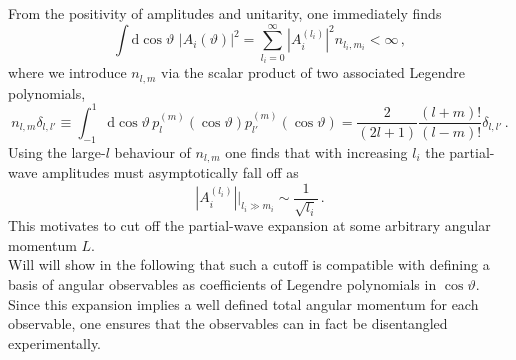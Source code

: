 \documentclass[aps,prd,reprint,nofootinbib,preprintnumbers]{revtex4}
\newcommand{\rmdx}[1]{\mbox{d} #1 \,} %
\renewcommand{\theta}{\vartheta}
\begin{document}
From the positivity of amplitudes and unitarity, one immediately finds
\begin{equation}
    \int \rmdx{\cos\theta}  \, |A_i(\theta)|^2 = \sum_{l_i = 0}^\infty |A_i^{(l_i)}|^2 n_{l_i, m_i} < \infty\,,
\end{equation}
where we introduce $n_{l,m}$ via the scalar product of two associated Legendre polynomials,
\begin{equation}
    \label{eq:legendre-scalar-product}
    n_{l, m} \delta_{l, l'} \equiv \int_{-1}^1 \rmdx{\cos\theta} p_{l}^{(m)}(\cos\theta) p_{l'}^{(m)} (\cos\theta)  = \frac{2}{(2 l + 1)} \frac{(l + m)!}{(l - m)!} \delta_{l, l'}\,.
\end{equation}
Using the large-$l$ behaviour of $n_{l,m}$ one finds that with
increasing $l_i$ the partial-wave amplitudes must asymptotically fall
off as
\begin{equation}
    |A_i^{(l_i)}| \Big|_{l_i \gg m_i} \sim \frac{1}{\sqrt{l_i}}\,.
\end{equation}
This motivates to cut off the partial-wave expansion at some arbitrary angular momentum $L$.\\

Will will show in the following that such a cutoff
is compatible with defining a basis of angular observables as coefficients of Legendre polynomials in $\cos\theta$. Since this expansion implies
a well defined total angular momentum for each observable, one ensures that the observables can in fact be disentangled experimentally.\\
\end{document}
